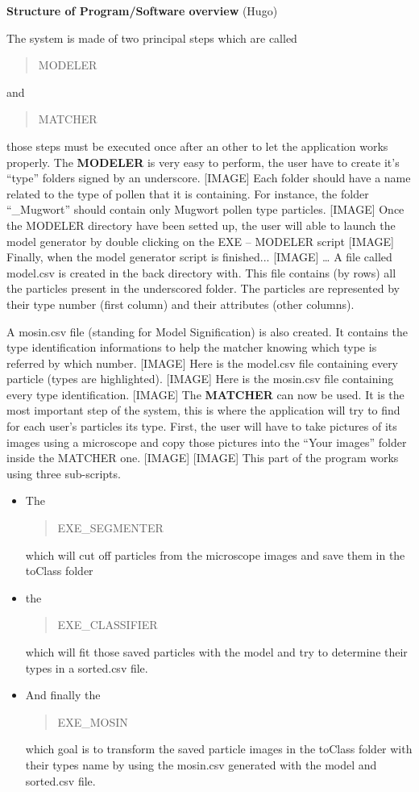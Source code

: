 \textbf{Structure of Program/Software overview} (Hugo) 

The system is made of two principal steps which are called \begin{quote}
MODELER
\end{quote} and \begin{quote}
MATCHER
\end{quote} those steps must be executed once after an other to let the application works properly.
The \textbf{MODELER} is very easy to perform, the user have to create it's “type” folders signed by an underscore.
[IMAGE]
Each folder should have a name related to the type of pollen that it is containing. For instance, the folder “_Mugwort” should contain only Mugwort pollen type particles.
[IMAGE]
Once the MODELER directory have been setted up, the user will able to launch the model generator by double clicking on the EXE – MODELER script
[IMAGE]
Finally, when the model generator script is finished...
[IMAGE]
… A file called model.csv is created in the back directory with. This file contains (by rows) all the particles present in the underscored folder. The particles are represented by their type number (first column) and their attributes (other columns).

A mosin.csv file (standing for Model Signification) is also created. It contains the type identification informations to help the matcher knowing which type is referred by which number.
[IMAGE]
Here is the model.csv file containing every particle (types are highlighted).
[IMAGE]
Here is the mosin.csv file containing every type identification.
[IMAGE]
The \textbf{MATCHER} can now be used. It is the most important step of the system, this is where the application will try to find for each user's particles its type.
First, the user will have to take pictures of its images using a microscope and copy those pictures into the “Your images” folder inside the MATCHER one.
[IMAGE]
[IMAGE]
This part of the program works using three sub-scripts.

\begin{itemize}
\item The \begin{quote}
EXE_SEGMENTER
\end{quote} which will cut off particles from the microscope images and save them in the toClass folder

\item the \begin{quote}
EXE_CLASSIFIER
\end{quote} which will fit those saved particles with the model and try to determine their types in a sorted.csv file.

\item And finally the \begin{quote}
EXE_MOSIN
\end{quote} which goal is to transform the saved particle images in the toClass folder with their types name by using the mosin.csv generated with the model and sorted.csv file.
\end{itemize}

